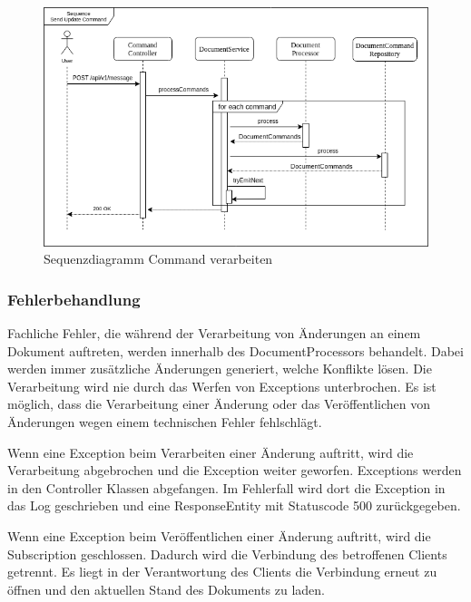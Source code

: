 \begin{figure}[h]
    \centering
    \begin{minipage}[b]{1\textwidth}
        \includegraphics[width=\textwidth]{graphics/seq_send_command.drawio}
        \caption{Sequenzdiagramm Command verarbeiten}
    \end{minipage}\label{fig:figuresqcmd}
\end{figure}

\subsubsection{Fehlerbehandlung}

Fachliche Fehler, die während der Verarbeitung von Änderungen an einem Dokument auftreten, werden innerhalb des DocumentProcessors behandelt.
Dabei werden immer zusätzliche Änderungen generiert, welche Konflikte lösen.
Die Verarbeitung wird nie durch das Werfen von Exceptions unterbrochen.
Es ist möglich, dass die Verarbeitung einer Änderung oder das Veröffentlichen von Änderungen wegen einem technischen Fehler fehlschlägt.

Wenn eine Exception beim Verarbeiten einer Änderung auftritt, wird die Verarbeitung abgebrochen und die Exception weiter geworfen.
Exceptions werden in den Controller Klassen abgefangen.
Im Fehlerfall wird dort die Exception in das Log geschrieben und eine ResponseEntity mit Statuscode 500 zurückgegeben.

Wenn eine Exception beim Veröffentlichen einer Änderung auftritt, wird die Subscription geschlossen.
Dadurch wird die Verbindung des betroffenen Clients getrennt.
Es liegt in der Verantwortung des Clients die Verbindung erneut zu öffnen und den aktuellen Stand des Dokuments zu laden.

